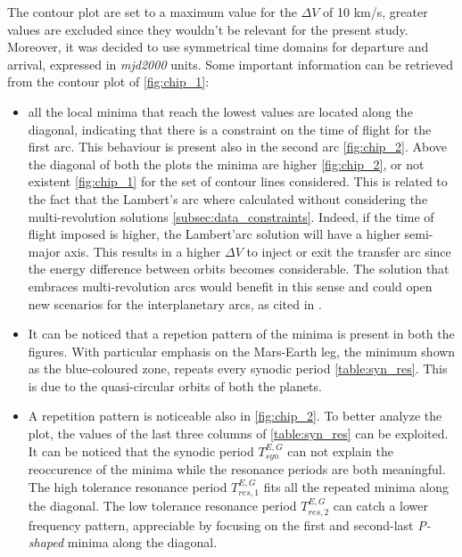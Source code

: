 
The contour plot are set to a maximum value for the $\Delta V$ of 10 km/s, greater values are excluded since they wouldn't be relevant for the present study. Moreover, it was decided to use symmetrical time domains for departure and arrival, expressed in \textit{mjd2000} units. 
Some important information can be retrieved from the contour plot of \autoref{fig:chip_1}:
\begin{itemize}
    [wide,itemsep=3pt,topsep=3pt]
    \item all the local minima that reach the lowest values are located along the diagonal, indicating that there is a constraint on the time of flight for the first arc. This behaviour is present also in the second arc \autoref{fig:chip_2}. Above the diagonal of both the plots the minima are higher \autoref{fig:chip_2}, or not existent \autoref{fig:chip_1} for the set of contour lines considered. This is related to the fact that the Lambert's arc where calculated without considering the multi-revolution solutions \autoref{subsec:data_constraints}. Indeed, if the time of flight imposed is higher, the Lambert'arc solution will have a higher semi-major axis. This results in a higher $\Delta V$ to inject or exit the transfer arc since the energy difference between orbits becomes considerable. The solution that embraces multi-revolution arcs would benefit in this sense and could open new scenarios for the interplanetary arcs, as cited in \cite{phd_menzio}.
    \item It can be noticed that a repetion pattern of the minima is present in both the figures. With particular emphasis on the Mars-Earth leg, the minimum shown as the blue-coloured zone, repeats every synodic period \autoref{table:syn_res}. This is due to the quasi-circular orbits of both the planets. 
    \item A repetition pattern is noticeable also in \autoref{fig:chip_2}. To better analyze the plot, the values of the last three columns of \autoref{table:syn_res} can be exploited. It can be noticed that the synodic period $T_{syn}^{E,G}$  can not explain the reoccurence of the minima while the resonance periods are both meaningful. The high tolerance resonance period $T_{res,1}^{E,G}$ fits all the repeated minima along the diagonal. The low tolerance resonance period $T_{res,2}^{E,G}$ can catch a lower frequency pattern, appreciable by focusing on the first and second-last \textit{P-shaped} minima along the diagonal.

\end{itemize}
